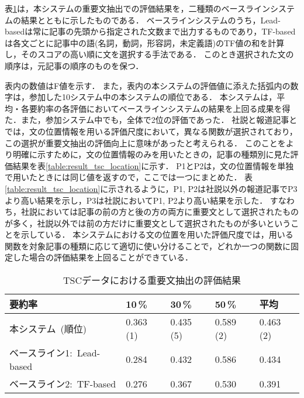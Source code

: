 表\ref{table:result_tsc}は，本システムの重要文抽出での評価結果を，二種類のベースラインシステムの結果とともに示したものである．
ベースラインシステムのうち，Lead-basedは常に記事の先頭から指定された文数まで出力するものであり，TF-basedは各文ごとに記事中の語(名詞，動詞，形容詞，未定義語)のTF値の和を計算し，そのスコアの高い順に文を選択する手法である．
このとき選択された文の順序は，元記事の順序のものを保つ．

表内の数値はF値を示す．
また，表内の本システムの評価値に添えた括弧内の数字は，参加した10システム中の本システムの順位である．
本システムは，平均・各要約率の各評価においてベースラインシステムの結果を上回る成果を得た．また，参加システム中でも，全体で2位の評価であった．
社説と報道記事とでは，文の位置情報を用いる評価尺度において，異なる関数が選択されており，この選択が重要文抽出の評価向上に意味があったと考えられる．
このことをより明確に示すために，文の位置情報のみを用いたときの，記事の種類別に見た評価結果を表\ref{table:result_tsc_location}に示す．
P1とP2は，文の位置情報を単独で用いたときには同じ値を返すので，ここでは一つにまとめた．
表\ref{table:result_tsc_location}に示されるように，P1, P2は社説以外の報道記事でP3より高い結果を示し，P3は社説においてP1, P2より高い結果を示した．
すなわち，社説においては記事の前の方と後の方の両方に重要文として選択されたものが多く，社説以外では前の方だけに重要文として選択されたものが多いということを示している．
本システムにおける文の位置を用いた評価尺度では，用いる関数を対象記事の種類に応じて適切に使い分けることで，どれか一つの関数に固定した場合の評価結果を上回ることができている．

\begin{table}[t]
\caption{TSCデータにおける重要文抽出の評価結果}
\begin{center}\label{table:result_tsc}
\begin{tabular}{l|lll|l} \hline
要約率 & 10\,\% & 30\,\% & 50\,\% & 平均 \\ \hline
本システム~(順位)  & 0.363 (1) & 0.435 (5) & 0.589 (2) & 0.463 (2) \\
ベースライン1:~Lead-based & 0.284 & 0.432 & 0.586 & 0.434 \\ 
ベースライン2:~TF-based   & 0.276 & 0.367 & 0.530 & 0.391 \\ \hline
\end{tabular}
\end{center}
\end{table}

